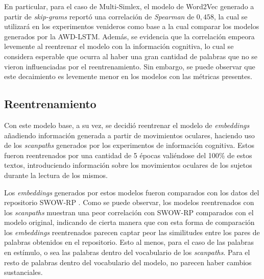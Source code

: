 En particular, para el caso de Multi-Simlex, el modelo de Word2Vec generado a partir de \textit{skip-grams} 
reportó una correlación de \textit{Spearman} de $0,458$, la cual se utilizará en los experimentos venideros 
como base a la cual comparar los modelos generados por la AWD-LSTM. Además, se evidencia que 
la correlación empeora levemente al reentrenar el modelo con la información cognitiva, lo 
cual se considera esperable que ocurra al haber una gran cantidad de palabras que no se 
vieron influenciadas por el reentrenamiento. Sin embargo, se puede observar que este 
decaimiento es levemente menor en los modelos con las métricas presentes.

\subsection{Reentrenamiento}

Con este modelo base, a su vez, se decidió reentrenar el modelo de \textit{embeddings} 
añadiendo información generada a partir de movimientos oculares, haciendo uso 
de los \textit{scanpaths} generados por los experimentos de información cognitiva. Estos 
fueron reentrenados por una cantidad de 5 épocas valiéndose del 100\% de estos 
textos, introduciendo información sobre los movimientos oculares de los sujetos 
durante la lectura de los mismos.

Los \textit{embeddings} generados por estos modelos fueron comparados con los datos 
del repositorio SWOW-RP .
 Como se puede observar, los modelos reentrenados con los \textit{scanpaths} muestran una peor 
correlación con SWOW-RP comparados con el modelo original, indicando de cierta manera 
que con esta forma de comparación los \textit{embeddings} reentrenados parecen captar peor las 
similitudes entre los pares de palabras obtenidos en el repositorio. Esto al menos, para 
el caso de las palabras en estímulo, o sea las palabras dentro del vocabulario de los 
\textit{scanpaths}. Para el resto de palabras dentro del vocabulario del modelo, no parecen haber 
cambios sustanciales.

